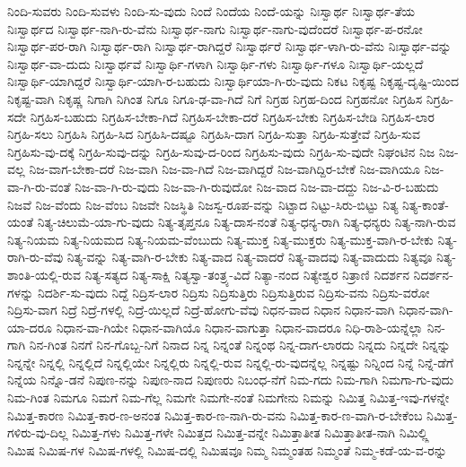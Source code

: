 {ನಿಂದಿ-ಸುವರು
ನಿಂದಿ-ಸುವಳು
ನಿಂದಿ-ಸು-ವುದು
ನಿಂದೆ
ನಿಂದೆಯ
ನಿಂದೆ-ಯನ್ನು
ನಿಃಸ್ವಾರ್ಥ
ನಿಃಸ್ವಾರ್ಥ-ತೆಯ
ನಿಃಸ್ವಾರ್ಥದ
ನಿಃಸ್ವಾರ್ಥ-ನಾಗಿ-ರು-ವೆನು
ನಿಃಸ್ವಾರ್ಥ-ನಾಗು
ನಿಃಸ್ವಾರ್ಥ-ನಾಗು-ವುದೆಂದರೆ
ನಿಃಸ್ವಾರ್ಥ-ಪ-ರನೋ
ನಿಃಸ್ವಾರ್ಥ-ಪರ-ರಾಗಿ
ನಿಃಸ್ವಾರ್ಥ-ರಾಗಿ
ನಿಃಸ್ವಾರ್ಥ-ರಾಗಿದ್ದರೆ
ನಿಃಸ್ವಾರ್ಥರೆ
ನಿಃಸ್ವಾರ್ಥ-ಳಾಗಿ-ರು-ವೆನು
ನಿಃಸ್ವಾರ್ಥ-ವನ್ನು
ನಿಃಸ್ವಾರ್ಥ-ವಾ-ದುದು
ನಿಃಸ್ವಾರ್ಥವೆ
ನಿಃಸ್ವಾರ್ಥಿ-ಗಳಾಗಿ
ನಿಃಸ್ವಾರ್ಥಿ-ಗಳು
ನಿಃಸ್ವಾರ್ಥಿ-ಗಳೂ
ನಿಃಸ್ವಾರ್ಥಿ-ಯಲ್ಲದೆ
ನಿಃಸ್ವಾರ್ಥಿ-ಯಾಗಿದ್ದರೆ
ನಿಃಸ್ವಾರ್ಥಿ-ಯಾಗಿ-ರ-ಬಹುದು
ನಿಃಸ್ವಾರ್ಥಿಯಾ-ಗಿ-ರು-ವುದು
ನಿಕಟ
ನಿಕೃಷ್ಟ
ನಿಕೃಷ್ಟ-ದೃಷ್ಟಿ-ಯಿಂದ
ನಿಕೃಷ್ಟ-ವಾಗಿ
ನಿಕೃಷ್ಣ
ನಿಗಾಗಿ
ನಿಗಿಂತ
ನಿಗೂ
ನಿಗೂ-ಢ-ವಾ-ಗಿದೆ
ನಿಗೆ
ನಿಗ್ರಹ
ನಿಗ್ರಹ-ದಿಂದ
ನಿಗ್ರಹನೋ
ನಿಗ್ರಹಿಸ
ನಿಗ್ರಹಿ-ಸದೇ
ನಿಗ್ರಹಿಸ-ಬಹುದು
ನಿಗ್ರಹಿಸ-ಬೇಕಾ-ಗಿದೆ
ನಿಗ್ರಹಿಸ-ಬೇಕಾ-ದರೆ
ನಿಗ್ರಹಿಸ-ಬೇಕು
ನಿಗ್ರಹಿಸ-ಬೇಡಿ
ನಿಗ್ರಹಿಸ-ಲಾರ
ನಿಗ್ರಹಿ-ಸಲು
ನಿಗ್ರಹಿಸಿ
ನಿಗ್ರಹಿ-ಸಿದ
ನಿಗ್ರಹಿಸಿ-ದಷ್ಟೂ
ನಿಗ್ರಹಿಸಿ-ದಾಗ
ನಿಗ್ರಹಿ-ಸುತ್ತಾ
ನಿಗ್ರಹಿ-ಸುತ್ತೇವೆ
ನಿಗ್ರಹಿ-ಸುವ
ನಿಗ್ರಹಿಸು-ವು-ದಕ್ಕೆ
ನಿಗ್ರಹಿ-ಸುವು-ದನ್ನು
ನಿಗ್ರಹಿ-ಸುವು-ದ-ರಿಂದ
ನಿಗ್ರಹಿಸು-ವುದು
ನಿಗ್ರಹಿ-ಸು-ವುದೇ
ನಿಘಂಟಿನ
ನಿಜ
ನಿಜ-ವಲ್ಲ
ನಿಜ-ವಾಗ-ಬೇಕಾ-ದರೆ
ನಿಜ-ವಾಗಿ
ನಿಜ-ವಾ-ಗಿದೆ
ನಿಜ-ವಾಗಿದ್ದರೆ
ನಿಜ-ವಾಗಿದ್ದಿರ-ಬೇಕೆ
ನಿಜ-ವಾಗಿಯೂ
ನಿಜ-ವಾ-ಗಿ-ರು-ವಂತೆ
ನಿಜ-ವಾ-ಗಿ-ರು-ವುದು
ನಿಜ-ವಾ-ಗಿ-ರುವುದೋ
ನಿಜ-ವಾದ
ನಿಜ-ವಾ-ದದ್ದು
ನಿಜ-ವಿ-ರ-ಬಹುದು
ನಿಜವೆ
ನಿಜ-ವೆಂದು
ನಿಜ-ವೆಂಬ
ನಿಜವೇ
ನಿಜಸ್ಥಿತಿ
ನಿಜಸ್ವ-ರೂಪ-ವನ್ನು
ನಿಟ್ಟಾದ
ನಿಟ್ಟು-ಸಿರು-ಬಿಟ್ಟು
ನಿತ್ಯ
ನಿತ್ಯ-ಕಾಂತೆ-ಯಂತೆ
ನಿತ್ಯ-ಚಿಲುಮೆ-ಯಾ-ಗು-ವುದು
ನಿತ್ಯ-ತೃಪ್ತನೂ
ನಿತ್ಯ-ದಾಸ-ನಂತೆ
ನಿತ್ಯ-ಧನ್ಯ-ರಾಗಿ
ನಿತ್ಯ-ಧನ್ಯರು
ನಿತ್ಯ-ನಾಗಿ-ರುವ
ನಿತ್ಯ-ನಿಯಮ
ನಿತ್ಯ-ನಿಯಮದ
ನಿತ್ಯ-ನಿಯಮ-ವೆಂಬುದು
ನಿತ್ಯ-ಮುಕ್ತ
ನಿತ್ಯ-ಮುಕ್ತರು
ನಿತ್ಯ-ಮುಕ್ತ-ವಾಗಿ-ರ-ಬೇಕು
ನಿತ್ಯ-ರಾಗಿ-ರು-ವೆವು
ನಿತ್ಯ-ವನ್ನು
ನಿತ್ಯ-ವಾಗಿ-ರ-ಬೇಕು
ನಿತ್ಯ-ವಾದ
ನಿತ್ಯ-ವಾದರೆ
ನಿತ್ಯ-ವಾದವು
ನಿತ್ಯ-ವಾದುದು
ನಿತ್ಯವೂ
ನಿತ್ಯ-ಶಾಂತಿ-ಯಲ್ಲಿ-ರುವ
ನಿತ್ಯ-ಸತ್ಯದ
ನಿತ್ಯ-ಸಾಕ್ಷಿ
ನಿತ್ಯಸ್ವಾ-ತಂತ್ರ್ಯ-ವಿದೆ
ನಿತ್ಯಾ-ನಂದ
ನಿತ್ಯೇಶ್ವರ
ನಿತ್ರಾಣಿ
ನಿದರ್ಶನ
ನಿದರ್ಶನ-ಗಳನ್ನು
ನಿದರ್ಶಿ-ಸು-ವುದು
ನಿದ್ದೆ
ನಿದ್ರಿಸ-ಲಾರ
ನಿದ್ರಿಸು
ನಿದ್ರಿಸುತ್ತಿರು
ನಿದ್ರಿಸುತ್ತಿರುವ
ನಿದ್ರಿಸು-ವನು
ನಿದ್ರಿಸು-ವರೋ
ನಿದ್ರಿಸು-ವಾಗ
ನಿದ್ರೆ
ನಿದ್ರೆ-ಗಳಲ್ಲಿ
ನಿದ್ರೆ-ಯಿಲ್ಲದೆ
ನಿದ್ರೆ-ಹೋಗು-ವೆವು
ನಿಧನ-ವಾದ
ನಿಧಾನ
ನಿಧಾನ-ವಾಗಿ
ನಿಧಾನ-ವಾಗಿ-ಯಾ-ದರೂ
ನಿಧಾನ-ವಾ-ಗಿಯೇ
ನಿಧಾನ-ವಾಗಿಯೊ
ನಿಧಾನ-ವಾಗುತ್ತಾ
ನಿಧಾನ-ವಾದರೂ
ನಿಧಿ-ರಾಶಿ-ಯನ್ನೆಲ್ಲಾ
ನಿನ-ಗಾಗಿ
ನಿನ-ಗಿಂತ
ನಿನಗೆ
ನಿನ-ಗೊಬ್ಬ-ನಿಗೆ
ನಿನಾದ
ನಿನ್ನ
ನಿನ್ನಂತೆ
ನಿನ್ನಂಥ
ನಿನ್ನ-ದಾಗ-ಲಾರದು
ನಿನ್ನದು
ನಿನ್ನದೇ
ನಿನ್ನನ್ನು
ನಿನ್ನನ್ನೇ
ನಿನ್ನಲ್ಲಿ
ನಿನ್ನಲ್ಲಿದೆ
ನಿನ್ನಲ್ಲಿಯೇ
ನಿನ್ನಲ್ಲಿರು
ನಿನ್ನಲ್ಲಿ-ರುವ
ನಿನ್ನಲ್ಲಿ-ರು-ವುದನ್ನೆಲ್ಲ
ನಿನ್ನಷ್ಟು
ನಿನ್ನಿಂದ
ನಿನ್ನೆ
ನಿನ್ನೆ-ಡೆಗೆ
ನಿನ್ನೆಯ
ನಿನ್ನೊ-ಡನೆ
ನಿಪುಣ-ನನ್ನು
ನಿಪುಣ-ನಾದ
ನಿಪುಣರು
ನಿಬಂಧ-ನೆಗೆ
ನಿಮ-ಗದು
ನಿಮ-ಗಾಗಿ
ನಿಮಗಾ-ಗು-ವುದು
ನಿಮ-ಗಿಂತ
ನಿಮಗೂ
ನಿಮಗೆ
ನಿಮ-ಗೆಲ್ಲ
ನಿಮಗೇ
ನಿಮಗೇ-ನಂತೆ
ನಿಮಗೇನು
ನಿಮನ್ನು
ನಿಮಿತ್ತ
ನಿಮಿತ್ತ-ಇವು-ಗಳನ್ನೇ
ನಿಮಿತ್ತ-ಕಾರಣ
ನಿಮಿತ್ತ-ಕಾರ-ಣ-ಅನಂತ
ನಿಮಿತ್ತ-ಕಾರ-ಣ-ನಾಗಿ-ರು-ವನು
ನಿಮಿತ್ತ-ಕಾರ-ಣ-ವಾಗಿ-ರ-ಬೇಕೆಂಬ
ನಿಮಿತ್ತ-ಗಳಿರು-ವು-ದಿಲ್ಲ
ನಿಮಿತ್ತ-ಗಳು
ನಿಮಿತ್ತ-ಗಳೇ
ನಿಮಿತ್ತದ
ನಿಮಿತ್ತ-ವನ್ನೇ
ನಿಮಿತ್ತಾತೀತ
ನಿಮಿತ್ತಾತೀತ-ನಾಗಿ
ನಿಮಿಲ್ಲ್ಲಿ
ನಿಮಿಷ
ನಿಮಿಷ-ಗಳ
ನಿಮಿಷ-ಗಳಲ್ಲಿ
ನಿಮಿಷ-ದಲ್ಲಿ
ನಿಮಿಷವೂ
ನಿಮ್ಮ
ನಿಮ್ಮಂತಹ
ನಿಮ್ಮಂತೆ
ನಿಮ್ಮ-ಕಡೆ-ಯ-ವ-ರನ್ನು
}
